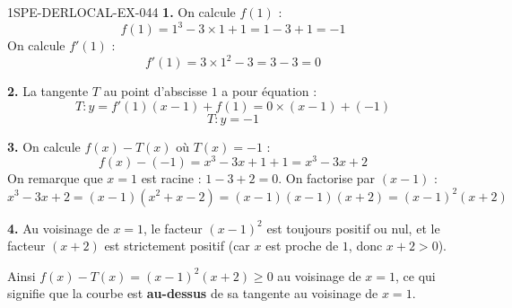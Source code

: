 \begin{corrige}{1SPE-DERLOCAL-EX-044}
\textbf{1.} On calcule $f(1)$ :
\[
f(1) = 1^3 - 3 \times 1 + 1 = 1 - 3 + 1 = -1
\]
On calcule $f'(1)$ :
\[
f'(1) = 3 \times 1^2 - 3 = 3 - 3 = 0
\]

\textbf{2.} La tangente $T$ au point d'abscisse $1$ a pour équation :
\[
T : y = f'(1)(x - 1) + f(1) = 0 \times (x - 1) + (-1)
\]
\[
\boxed{T : y = -1}
\]

\textbf{3.} On calcule $f(x) - T(x)$ où $T(x) = -1$ :
\[
f(x) - (-1) = x^3 - 3x + 1 + 1 = x^3 - 3x + 2
\]
On remarque que $x = 1$ est racine : $1 - 3 + 2 = 0$. On factorise par $(x - 1)$ :
\[
x^3 - 3x + 2 = (x - 1)(x^2 + x - 2) = (x - 1)(x - 1)(x + 2) = (x-1)^2(x+2)
\]

\textbf{4.} Au voisinage de $x = 1$, le facteur $(x-1)^2$ est toujours positif ou nul, et le facteur $(x+2)$ est strictement positif (car $x$ est proche de $1$, donc $x + 2 > 0$).

Ainsi $f(x) - T(x) = (x-1)^2(x+2) \geqslant 0$ au voisinage de $x = 1$, ce qui signifie que la courbe est \textbf{au-dessus} de sa tangente au voisinage de $x = 1$.
\end{corrige}
